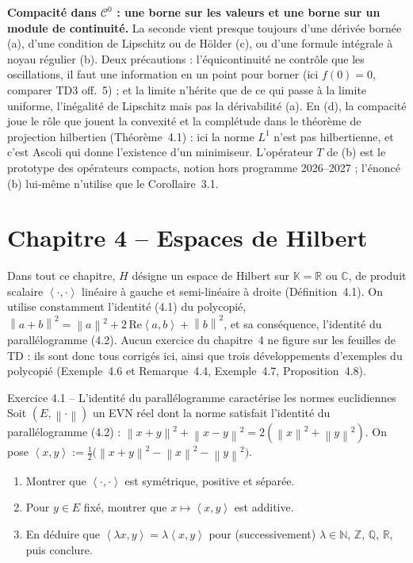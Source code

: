\documentclass[11pt,a4paper]{article}
\newcommand{\R}{\mathbb{R}}
\newcommand{\N}{\mathbb{N}}
\newcommand{\Z}{\mathbb{Z}}
\newcommand{\Q}{\mathbb{Q}}
\newcommand{\C}{\mathbb{C}}
\newcommand{\K}{\mathbb{K}}
\newcommand{\norm}[1]{\left\|#1\right\|}
\newcommand{\Cz}{\mathcal{C}^0}
\newcommand{\ps}[2]{\left\langle #1,#2\right\rangle}
\theoremstyle{definition}
\begin{document}
\begin{pointcle}
\textbf{Compacité dans $\Cz$ : une borne sur les valeurs et une borne sur un module de continuité.} La seconde vient presque toujours d'une dérivée bornée (a), d'une condition de Lipschitz ou de Hölder (c), ou d'une formule intégrale à noyau régulier (b). Deux précautions : l'équicontinuité ne contrôle que les oscillations, il faut une information en un point pour borner (ici $f(0)=0$, comparer TD3 off.~5) ; et la limite n'hérite que de ce qui passe à la limite uniforme, l'inégalité de Lipschitz mais pas la dérivabilité (a). En (d), la compacité joue le rôle que jouent la convexité et la complétude dans le théorème de projection hilbertien (Théorème~4.1) : ici la norme $L^1$ n'est pas hilbertienne, et c'est Ascoli qui donne l'existence d'un minimiseur. L'opérateur $T$ de (b) est le prototype des opérateurs compacts, notion hors programme 2026--2027 ; l'énoncé (b) lui-même n'utilise que le Corollaire~3.1.
\end{pointcle}

\section{Chapitre 4 -- Espaces de Hilbert}

\begin{commentaire}
Dans tout ce chapitre, $H$ désigne un espace de Hilbert sur $\K=\R$ ou $\C$, de produit scalaire $\ps\cdot\cdot$ linéaire à gauche et semi-linéaire à droite (Définition~4.1). On utilise constamment l'identité (4.1) du polycopié, $\norm{a+b}^2=\norm a^2+2\,\mathrm{Re}\ps ab+\norm b^2$, et sa conséquence, l'identité du parallélogramme (4.2). Aucun exercice du chapitre~4 ne figure sur les feuilles de TD : ils sont donc tous corrigés ici, ainsi que trois développements d'exemples du polycopié (Exemple~4.6 et Remarque~4.4, Exemple~4.7, Proposition~4.8).
\end{commentaire}

\begin{exo}{Exercice 4.1 -- L'identité du parallélogramme caractérise les normes euclidiennes}
Soit $(E,\norm\cdot)$ un EVN réel dont la norme satisfait l'identité du parallélogramme (4.2) : $\norm{x+y}^2+\norm{x-y}^2=2(\norm x^2+\norm y^2)$. On pose $\ps xy:=\frac12\big(\norm{x+y}^2-\norm x^2-\norm y^2\big)$.
\begin{enumerate}[label=(\arabic*)]
  \item Montrer que $\ps\cdot\cdot$ est symétrique, positive et séparée.
  \item Pour $y\in E$ fixé, montrer que $x\mapsto\ps xy$ est additive.
  \item En déduire que $\ps{\lambda x}y=\lambda\ps xy$ pour (successivement) $\lambda\in\N$, $\Z$, $\Q$, $\R$, puis conclure.
\end{enumerate}
\end{exo}
\end{document}
